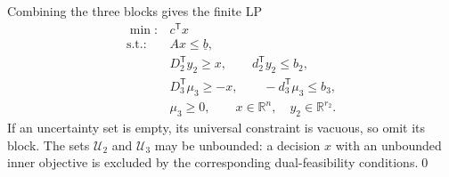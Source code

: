 \documentclass[11pt]{article}
\newcommand{\R}{\mathbb R}
\newcommand{\T}{^{\mathsf T}}
\newcommand{\finishsolution}{\qed\par}
\begin{document}
\begin{enumerate}
Combining the three blocks gives the finite LP
\[
\begin{array}{rl}
\min:&c\T x\\
\text{s.t.}:&Ax\le\underline b,\\
&D_2\T y_2\ge x,\qquad d_2\T y_2\le b_2,\\
&D_3\T\mu_3\ge-x,\qquad-d_3\T\mu_3\le b_3,\\
&\mu_3\ge0,\qquad x\in\R^n,\quad y_2\in\R^{r_2}.
\end{array}
\]
If an uncertainty set is empty, its universal constraint is vacuous,
so omit its block. The sets $\mathcal U_2$ and $\mathcal U_3$ may be
unbounded: a decision $x$ with an unbounded inner objective is excluded
by the corresponding dual-feasibility conditions.\finishsolution
\end{enumerate}
\end{document}
